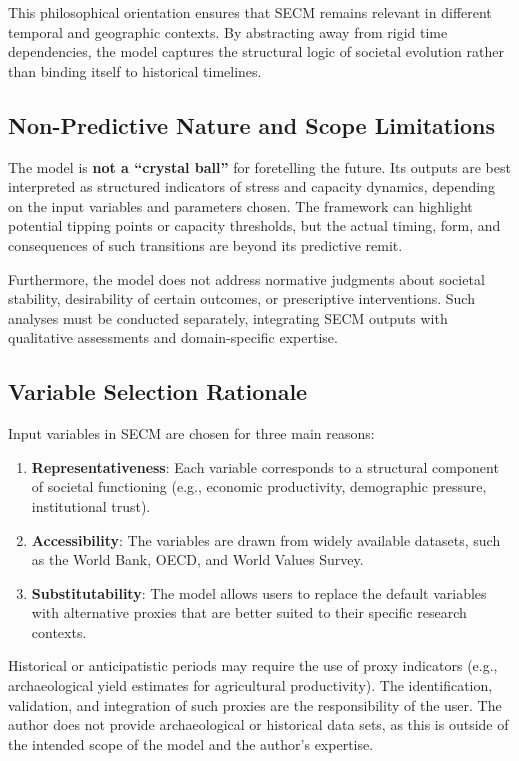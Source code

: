 \documentclass[12pt,a4paper]{article}
\begin{document}
This philosophical orientation ensures that SECM remains relevant in different temporal and geographic contexts. By abstracting away from rigid time dependencies, the model captures the structural logic of societal evolution rather than binding itself to historical timelines.

\subsection{Non-Predictive Nature and Scope Limitations}
The model is \textbf{not a “crystal ball”} for foretelling the future. Its outputs are best interpreted as structured indicators of stress and capacity dynamics, depending on the input variables and parameters chosen. The framework can highlight potential tipping points or capacity thresholds, but the actual timing, form, and consequences of such transitions are beyond its predictive remit.

Furthermore, the model does not address normative judgments about societal stability, desirability of certain outcomes, or prescriptive interventions. Such analyses must be conducted separately, integrating SECM outputs with qualitative assessments and domain-specific expertise.

\subsection{Variable Selection Rationale}
Input variables in SECM are chosen for three main reasons:
\begin{enumerate}
    \item \textbf{Representativeness}: Each variable corresponds to a structural component of societal functioning (e.g., economic productivity, demographic pressure, institutional trust).
    \item \textbf{Accessibility}: The variables are drawn from widely available datasets, such as the World Bank, OECD, and World Values Survey.
    \item \textbf{Substitutability}: The model allows users to replace the default variables with alternative proxies that are better suited to their specific research contexts.
\end{enumerate}

Historical or anticipatistic periods may require the use of proxy indicators (e.g., archaeological yield estimates for agricultural productivity). The identification, validation, and integration of such proxies are the responsibility of the user. The author does not provide archaeological or historical data sets, as this is outside of the intended scope of the model and the author's expertise.
\end{document}
